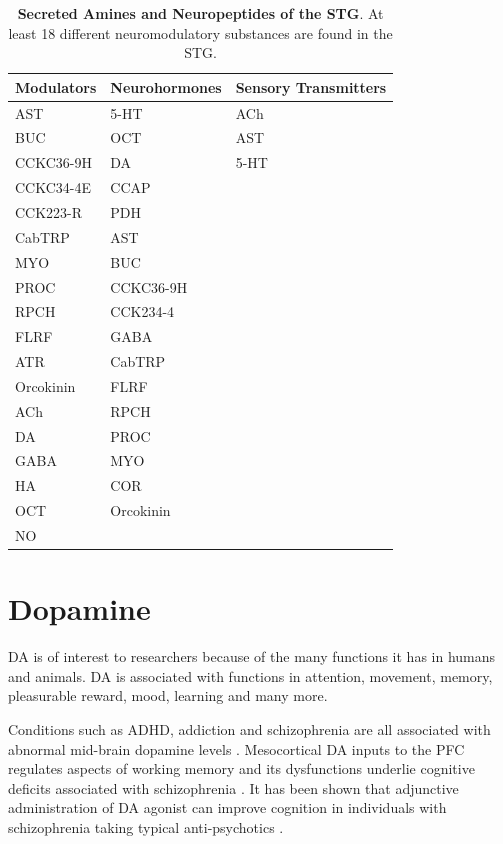 \begin{table}[htbp]
	\centering
	\caption[Secreted Amines and Neuropeptides of the \ac{STG}]{\textbf{Secreted Amines and Neuropeptides of the \ac{STG}}. At least 18 different neuromodulatory substances are found in the \ac{STG}.}
	\begin{tabular}{l l l}
		\hline \bf Modulators & \textbf{Neurohormones} & \textbf{Sensory Transmitters} \\\hline
		AST   & 5-HT  & ACh \\
		BUC   & OCT   & AST \\
		CCKC36-9H & DA    & 5-HT \\
		CCKC34-4E & CCAP  &  \\
		CCK223-R & PDH   &  \\
		CabTRP & AST   &  \\
		MYO   & BUC   &  \\
		PROC  & CCKC36-9H &  \\
		RPCH  & CCK234-4 &  \\
		FLRF  & GABA  &  \\
		ATR   & CabTRP &  \\
		Orcokinin & FLRF  &  \\
		ACh   & RPCH  &  \\
		DA    & PROC  &  \\
		GABA  & MYO   &  \\
		HA    & COR   &  \\
		OCT   & Orcokinin &  \\
		NO    &       &  \\
		\hline 
	\end{tabular}%
	\label{tab:neuromodulators}%
\end{table}%


\section{Dopamine}

\Ac{DA} is of interest to researchers because of the many functions it has in humans and animals. \Ac{DA} is associated with functions in attention, movement, memory, pleasurable reward, mood, learning and many more.

Conditions such as ADHD, addiction and schizophrenia are all associated with abnormal mid-brain dopamine levels \cite{Lammel2008}. Mesocortical \ac{DA} inputs to the \ac{PFC} regulates aspects of working memory and its dysfunctions underlie cognitive deficits associated with schizophrenia \cite{ Barch2012, Seamans2004, Slifstein2015}. It has been shown that adjunctive administration of \ac{DA} agonist can improve cognition in individuals with schizophrenia taking typical anti-psychotics \cite{Barch2005}.

